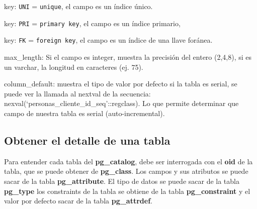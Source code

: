 key: \texttt{UNI} = \texttt{unique}, el campo es un \'indice \'unico.

 
key:	 \texttt{PRI} = \texttt{primary key}, el campo es un \'indice primario, 

key:	 \texttt{FK} = \texttt{foreign key}, el campo es un \'indice de una llave for\'anea.

max\_length: Si el campo es integer, muestra la precisi\'on del entero (2,4,8), si es un varchar, la longitud en caracteres (ej. 75).

column\_default: muestra el tipo de valor por defecto si la tabla es serial, se puede ver la llamada al nextval de la secuencia: nexval(‘personas\_cliente\_id\_seq'::regclass). Lo que permite determinar que campo de nuestra tabla es serial (auto-incremental).

\subsection{Obtener el detalle de una tabla} 
Para entender cada tabla del \textbf{pg\_catalog}, debe ser interrogada con el \textbf{oid} de la tabla, que se puede obtener de \textbf{pg\_class}.
Los campos y sus atributos se puede sacar de la tabla \textbf{pg\_attribute}.
El tipo de datos se puede sacar de la tabla \textbf{pg\_type}
los constraints de la tabla se obtiene de la tabla \textbf{pg\_constraint}
y el valor por defecto sacar de la tabla \textbf{pg\_attrdef}.
